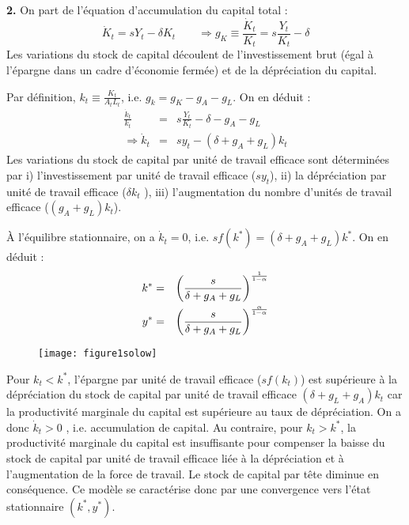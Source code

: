 \documentclass[11pt,a4paper]{article}
\begin{document}
\noindent \textbf{2.} On part de l'\'equation d'accumulation du capital
total : 
\begin{equation*}
\dot{K}_t=s Y_t-\delta K_t \quad \quad \Rightarrow g_K\equiv \frac{\dot{K}_t%
}{K_t}=s\frac{Y_t}{K_t}-\delta
\end{equation*}
Les variations du stock de capital d\'ecoulent de l'investissement brut
(\'egal \`a l'\'epargne dans un cadre d'\'economie ferm\'ee) et de la
d\'epr\'eciation du capital.

\smallskip Par d\'efinition, $k_t\equiv \frac{K_t}{A_tL_t}$, i.e. $%
g_k=g_K-g_A-g_L$. On en d\'eduit : 
\begin{eqnarray*}
\frac{\dot{k}_t}{k_t}&=&s\frac{Y_t}{K_t}-\delta-g_A-g_L \\
\Rightarrow \dot{k}_t&=&sy_t-(\delta+g_A+g_L)k_t
\end{eqnarray*}
Les variations du stock de capital par unit\'e de travail efficace sont
d\'etermin\'ees par i) l'investissement par unit\'e de travail efficace ($%
sy_t$), ii) la d\'epr\'eciation par unit\'e de travail efficace ($\delta k_t$%
), iii) l'augmentation du nombre d'unit\'es de travail efficace ($%
(g_A+g_L)k_t$).

\smallskip À  l'\'{e}quilibre stationnaire, on a $\dot{k}_{t}=0$, i.e. $%
sf(k^{\ast })=(\delta +g_{A}+g_{L})k^{\ast }$. On en d\'{e}duit : 
\begin{eqnarray*}
k^{\ast } &=&\left( \frac{s}{\delta +g_{A}+g_{L}}\right) ^{\frac{1}{1-\alpha 
}} \\
y^{\ast } &=&\left( \frac{s}{\delta +g_{A}+g_{L}}\right) ^{\frac{\alpha }{%
1-\alpha }}
\end{eqnarray*}


\begin{figure}[th]
\centering
\texttt{[image: figure1solow]}
\label{fig:1.4}
\end{figure}


Pour $k_t<k^\ast$, l'\'epargne par unit\'e de travail efficace ($sf(k_t)$)
est sup\'erieure \`a la d\'epr\'eciation du stock de capital par unit\'e de
travail efficace $(\delta+g_L+g_A)k_t$ car la productivit\'e marginale du
capital est sup\'erieure au taux de d\'epr\'eciation. On a donc $\dot{k}_t>0$%
, i.e. accumulation de capital. Au contraire, pour $k_t>k^\ast$, la
productivit\'e marginale du capital est insuffisante pour compenser la
baisse du stock de capital par unit\'e de travail efficace li\'ee \`a la
d\'epr\'eciation et \`a l'augmentation de la force de travail. Le stock de
capital par t\^ete diminue en cons\'equence. Ce mod\`ele se caract\'erise
donc par une convergence vers l'\'etat stationnaire $(k^\ast,y^\ast)$.
\end{document}
